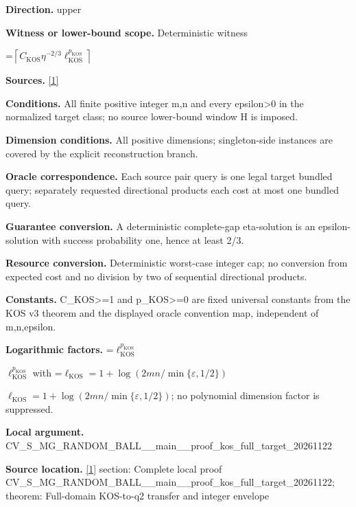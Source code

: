 \documentclass[10pt,a4paper]{article}
\newcommand{\AtlasMath}[1]{\par\begingroup\centering\setbox0=\hbox{$\displaystyle #1$}\ifdim\wd0>1.4\linewidth\typeout{ATLAS WIDE FORMULA: \the\wd0}\fi\ifdim\wd0>\linewidth\resizebox{\linewidth}{!}{\box0}\else\box0\fi\par\endgroup}
\newcommand{\AtlasInlineMath}[1]{\begingroup\setbox0=\hbox{$#1$}\ifdim\wd0>.4\linewidth\endgroup\AtlasMath{#1}\else\endgroup$#1$\fi}
\begin{document}
\textbf{Direction.} upper



\textbf{Witness or lower-bound scope.} Deterministic witness



\AtlasMath{\left\lceil C_{\mathrm{KOS}}\eta^{-2/3}\ell_{\mathrm{KOS}}^{p_{\mathrm{KOS}}}\right\rceil}


\textbf{Sources.} \href{https://arxiv.org/pdf/2601.02347v3}{[1]}



\textbf{Conditions.} All finite positive integer m,n and every epsilon>0 in the normalized target class; no source lower-bound window H is imposed.



\textbf{Dimension conditions.} All positive dimensions; singleton-side instances are covered by the explicit reconstruction branch.



\textbf{Oracle correspondence.} Each source pair query is one legal target bundled query; separately requested directional products each cost at most one bundled query.



\textbf{Guarantee conversion.} A deterministic complete-gap eta-solution is an epsilon-solution with success probability one, hence at least 2/3.



\textbf{Resource conversion.} Deterministic worst-case integer cap; no conversion from expected cost and no division by two of sequential directional products.



\textbf{Constants.} C\_KOS>=1 and p\_KOS>=0 are fixed universal constants from the KOS v3 theorem and the displayed oracle convention map, independent of m,n,epsilon.



\textbf{Logarithmic factors.} \AtlasInlineMath{\ell_{\mathrm{KOS}}^{p_{\mathrm{KOS}}}} with \AtlasInlineMath{\ell_{\mathrm{KOS}}=1+\log(2mn/\min\{\varepsilon,1/2\})}; no polynomial dimension factor is suppressed.



\textbf{Local argument.} CV\_S\_MG\_RANDOM\_BALL\_\_mai\allowbreak{}n\_\_proof\_kos\_full\_target\allowbreak{}\_20261122



\textbf{Source location.} \href{https://arxiv.org/pdf/2601.02347v3}{[1]} section: Complete local proof CV\_S\_MG\_RANDOM\_BALL\_\_mai\allowbreak{}n\_\_proof\_kos\_full\_target\allowbreak{}\_20261122; theorem: Full-domain KOS-to-q2 transfer and integer envelope
\end{document}
